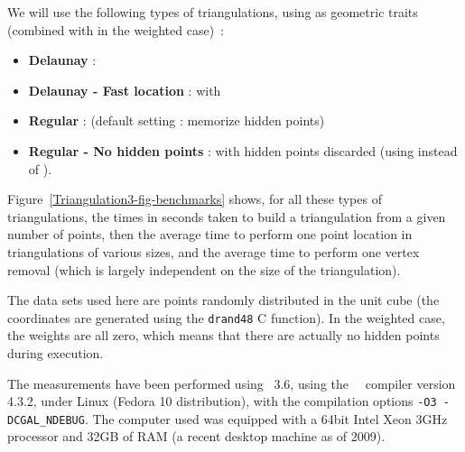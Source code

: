We will use the following types of triangulations, using
 as geometric traits
(combined with  in the weighted
case)~:
\begin{itemize}
\item \textbf{Delaunay} : 
\item \textbf{Delaunay - Fast location} :  with 
\item \textbf{Regular} :  (default setting : memorize hidden points)
\item \textbf{Regular - No hidden points} :  with hidden points discarded (using
       instead of ).
\end{itemize}

Figure~\ref{Triangulation3-fig-benchmarks} shows, for all these types of
triangulations, the times in seconds taken to build a triangulation from a
given number of points, then the average time to perform one point location in
triangulations of various sizes, and the average time to perform one vertex
removal (which is largely independent on the size of the triangulation).

The data sets used here are points randomly distributed in the unit cube (the
coordinates are generated using the \texttt{drand48} C function).  In the
weighted case, the weights are all zero, which means that there are actually no
hidden points during execution.

The measurements have been performed using \cgal\ 3.6, using the \gnu\ \CC\ compiler
version 4.3.2, under Linux (Fedora 10 distribution), with the compilation options
\texttt{-O3 -DCGAL\_NDEBUG}.  The computer used was equipped with a 64bit Intel
Xeon 3GHz processor and 32GB of RAM (a recent desktop machine as of 2009).

